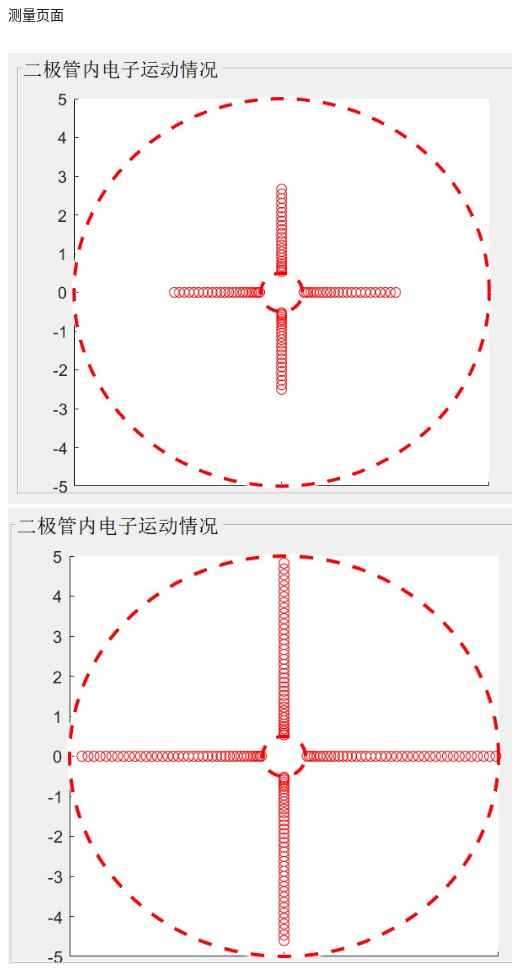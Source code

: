 \documentclass{beamer}
\begin{document}
\begin{frame}{测量页面}{\thesection \, \secname}
\begin{columns}
\begin{column}{0.3\textwidth}
                \includegraphics[scale=0.35]{gallery/move3.jpg}
                \includegraphics[scale=0.35]{gallery/move4.jpg}
            \end{column}
        \end{columns}
    \end{frame}
\end{document}
